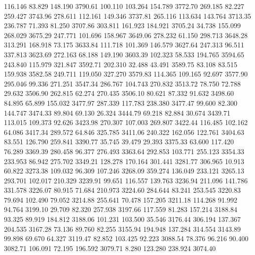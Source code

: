  116.146   83.829  148.190      3790.61
 100.110  103.264  154.789      3772.70
 269.185   82.227  259.427      3743.96
 278.611  112.161  149.346      3737.81
 265.116  113.634  143.764      3713.35
 236.787   71.393   81.250      3707.86
 303.811  161.923  184.921      3705.24
  34.738  155.099  268.029      3675.29
 247.771  101.696  158.967      3649.06
 278.232   61.150  298.713      3648.28
 313.291  168.918   73.175      3633.84
 111.718  101.369  146.579      3627.64
 247.313   96.511  337.813      3623.69
 272.163   68.188  149.190      3603.39
 102.323   58.533  194.765      3594.65
 243.840  115.979  321.847      3592.71
 202.310   32.488   43.491      3589.75
  83.108   83.515  159.938      3582.58
 249.711  119.050  327.270      3579.83
 114.365  109.165   92.697      3577.90
 295.046   99.336  271.251      3547.34
 286.767  104.743  270.832      3513.72
  78.750   72.788   29.632      3506.90
 262.815   62.274  270.435      3506.10
  80.621   87.332   91.632      3498.60
  84.895   65.899  155.032      3477.97
 287.339  117.783  238.380      3477.47
  99.600   82.300  144.747      3474.33
  89.804   69.130   26.324      3444.79
  69.218   82.884   30.674      3439.71
 113.015  109.373   92.626      3423.98
 270.307  107.003  269.807      3422.44
 116.485  102.162   64.086      3417.34
 289.572   64.846  325.785      3411.06
 240.322  162.056  122.761      3404.63
  83.551  126.790  259.841      3390.77
  35.745   39.479   29.393      3375.33
  63.600  117.420   76.289      3369.39
 280.458   96.377  276.493      3363.64
 292.853  103.771  255.123      3354.33
 233.953   86.942  275.702      3349.21
 128.278  170.164  301.441      3281.77
 306.965   10.913   60.822      3273.38
 109.032   96.309  107.246      3268.09
 359.274  136.049  233.121      3265.13
 293.701  102.017  210.329      3239.91
  99.651  116.557  139.763      3236.94
 211.096  141.786  331.578      3226.07
  80.915   71.684  210.973      3224.60
 284.644   83.241  253.545      3220.83
  79.694  102.490   79.052      3214.88
 255.641   70.478  157.205      3211.18
 114.268   91.992   94.764      3199.10
  29.709   82.320  257.938      3197.66
 117.559   81.283  157.214      3188.84
  93.325   89.919  184.812      3188.06
 101.231  103.500   35.546      3176.44
 306.194  137.367  204.535      3167.28
  73.136   89.760   82.255      3155.94
 194.948  137.284  314.554      3143.89
  99.898   69.670   64.327      3119.47
  82.852  103.425   92.223      3088.54
  78.376   96.216   90.400      3082.71
 106.091   72.195  196.592      3079.71
   8.280  123.280  238.924      3074.40
